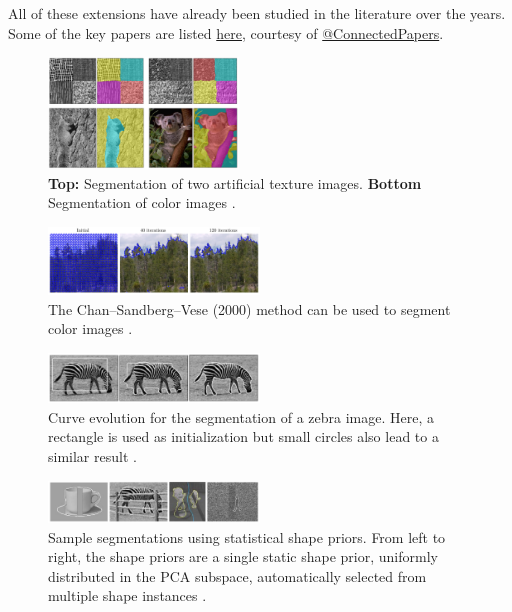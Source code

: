 \documentclass[journal]{IEEEtran}
\begin{document}
All of these extensions have already been studied in the literature over the years. Some of the key papers are listed \textcolor{blue}{\href{https://www.connectedpapers.com/main/3bdcc6c663112ab10ffb5b5e875f8e2660cd5001/Active-contours-without-edges/derivative}{here}}, courtesy of \textcolor{blue}{\href{https://www.connectedpapers.com/}{@ConnectedPapers}}.

\begin{figure}[!t]
    \centering
    \includegraphics[width=0.45\textwidth]{images/honorable-mentions-1-2-combined.png}
    \caption{\textbf{Top:} Segmentation of two artificial texture images. \textbf{Bottom} Segmentation of color images \cite{Brox2004}.}
    \label{fig:honorable-mentions-1-2-combined}
\end{figure}

\begin{figure}[!t]
    \centering
    \includegraphics[width=0.5\textwidth]{images/honorable-mentions-7.png}
    \caption{The Chan--Sandberg--Vese (2000) \cite{Chan2000} method can be used to segment color images \cite{getreuer}.}
    \label{fig:honorable-mentions-7}
\end{figure}

\begin{figure}[!t]
    \centering
    \includegraphics[width=0.5\textwidth]{images/honorable-mentions-5.png}
    \caption{Curve evolution for the segmentation of a zebra image. Here, a rectangle is used as initialization but small circles also lead to a similar result \cite{Cremers2006}.}
    \label{fig:honorable-mentions-5}
\end{figure}

\begin{figure}[!t]
    \centering
    \includegraphics[width=0.5\textwidth]{images/honorable-mentions-6.png}
    \caption{Sample segmentations using statistical shape priors. From left to right, the shape priors are a single static shape prior, uniformly distributed in the PCA subspace, automatically selected from multiple shape instances \cite{Cremers2006}.}
    \label{fig:honorable-mentions-6}
\end{figure}
\end{document}
